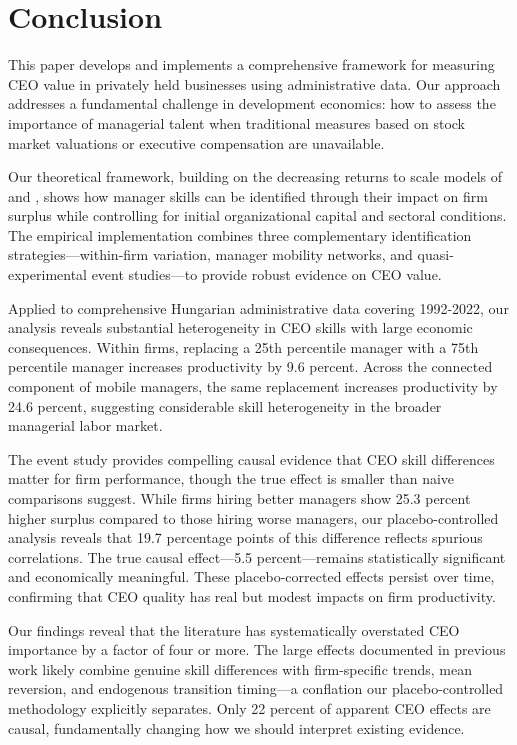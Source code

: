 \documentclass[11pt,a4paper]{article}
\begin{document}
\section{Conclusion}

This paper develops and implements a comprehensive framework for measuring CEO value in privately held businesses using administrative data. Our approach addresses a fundamental challenge in development economics: how to assess the importance of managerial talent when traditional measures based on stock market valuations or executive compensation are unavailable.

Our theoretical framework, building on the decreasing returns to scale models of \citet{AtkesonKehoe2005JPE} and \citet{McGrattan2012RED}, shows how manager skills can be identified through their impact on firm surplus while controlling for initial organizational capital and sectoral conditions. The empirical implementation combines three complementary identification strategies---within-firm variation, manager mobility networks, and quasi-experimental event studies---to provide robust evidence on CEO value.

Applied to comprehensive Hungarian administrative data covering 1992-2022, our analysis reveals substantial heterogeneity in CEO skills with large economic consequences. Within firms, replacing a 25th percentile manager with a 75th percentile manager increases productivity by 9.6 percent. Across the connected component of mobile managers, the same replacement increases productivity by 24.6 percent, suggesting considerable skill heterogeneity in the broader managerial labor market.

The event study provides compelling causal evidence that CEO skill differences matter for firm performance, though the true effect is smaller than naive comparisons suggest. While firms hiring better managers show 25.3 percent higher surplus compared to those hiring worse managers, our placebo-controlled analysis reveals that 19.7 percentage points of this difference reflects spurious correlations. The true causal effect---5.5 percent---remains statistically significant and economically meaningful. These placebo-corrected effects persist over time, confirming that CEO quality has real but modest impacts on firm productivity.

Our findings reveal that the literature has systematically overstated CEO importance by a factor of four or more. The large effects documented in previous work likely combine genuine skill differences with firm-specific trends, mean reversion, and endogenous transition timing---a conflation our placebo-controlled methodology explicitly separates. Only 22 percent of apparent CEO effects are causal, fundamentally changing how we should interpret existing evidence.
\end{document}
